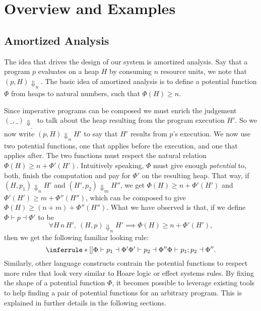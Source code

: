 \documentclass[10pt]{article}
\begin{document}
\section{Overview and Examples}

\subsection{Amortized Analysis}
The idea that drives the design of our system is amortized
analysis.  Say that a program $p$ evaluates on a heap $H$
by consuming $n$ resource units, we note that $(p, H) \Downarrow_n$.
The basic idea of amortized analysis is to define a potential function
$\Phi$ from heaps to natural numbers, such that $\Phi(H) \ge n$.

Since imperative programs can be composed we must enrich
the judgement $(\_, \_) \Downarrow_{\_}$ to talk about the heap
resulting from the program execution $H'$.  So we now write
$(p, H) \Downarrow_n H'$ to say that $H'$ results from $p$'s
execution.  We now use two potential functions, one
that applies before the execution, and one that applies
after.  The two functions must respect the natural relation
$\Phi(H) \ge n + \Phi'(H')$.  Intuitively speaking, $\Phi$ must
give enough \emph{potential} to, both, finish the computation
and pay for $\Phi'$ on the resulting heap. That way, if $(H, p_1) \Downarrow_n H'$
and $(H', p_2) \Downarrow_m H''$, we get $\Phi(H) \ge
n + \Phi'(H')$ and $\Phi'(H') \ge m + \Phi''(H'')$, which
can be composed to give $\Phi(H) \ge (n + m) + \Phi''(H'')$.
What we have observed is that, if we define $\Phi \vdash p \dashv \Phi'$
to be
$$
\forall H\,n\,H',~(H, p)\Downarrow_n H' \implies \Phi(H) \ge
n + \Phi'(H'),
$$
then we get the following familiar looking rule:
$$
\RuleNolabel
{\Phi \vdash p_1 \dashv \Phi' \\ \Phi' \vdash p_2 \dashv \Phi''}
{\Phi \vdash p_1; p_2 \dashv \Phi''}
.
$$
Similarly, other language constructs contrain the potential
functions to respect more rules that look very similar to
Hoare logic or effect systems rules.  By fixing the shape of
a potential function $\Phi$, it becomes possible to leverage
existing tools to help finding a pair of potential functions
for an arbitrary program.  This is explained in further details
in the following sections.
\end{document}
